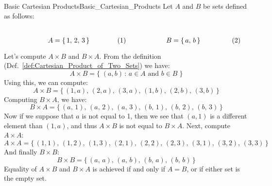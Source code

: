         \begin{fexample}{Basic Cartesian Products}{Basic_Cartesian_Products}
            Let $A$ and $B$ be sets defined as follows:
            \par
            \begin{subequations}
                \begin{minipage}[b]{0.49\textwidth}
                    \centering
                    \begin{equation}
                        A=\{\,1,\,2,\,3\,\}
                    \end{equation}
                \end{minipage}
                \hfill
                \begin{minipage}[b]{0.49\textwidth}
                    \centering
                    \begin{equation}
                        B=\{\,a,\,b\,\}
                    \end{equation}
                \end{minipage}
            \end{subequations}
            \par\vspace{2.5ex}
            Let's compute $A\times{B}$ and $B\times{A}$. From the definition
            (Def.~\ref{def:Cartesian_Product_of_Two_Sets}) we have:
            \begin{equation}
                A\times{B}=\{\;(a,b)\,:\,a\in{A}\textrm{ and }b\in{B}\;\}
            \end{equation}
            Using this, we can compute:
            \begin{equation}
                A\times{B}=\big\{\,(1,a),\,(2,a),\,(3,a),\,
                                   (1,b),\,(2,b),\,(3,b)\,\big\}
            \end{equation}
            Computing $B\times{A}$, we have:
            \begin{equation}
                B\times{A}=\big\{\,(a,\,1),\,(a,\,2),\,(a,\,3),\,
                                   (b,\,1),\,(b,\,2),\,(b,\,3)\,\big\}
            \end{equation}
            Now if we suppose that $a$ is not equal to 1, then we see that
            $(a,1)$ is a different element than $(1,a)$, and thus $A\times{B}$
            is not equal to $B\times{A}$. Next, compute $A\times{A}$:
            \begin{equation}
                A\times{A}=\big\{\,(1,1),\,(1,2),\,(1,3),\,
                                   (2,1),\,(2,2),\,(2,3),\,
                                   (3,1),\,(3,2),\,(3,3)\,\big\}
            \end{equation}
            And finally $B\times{B}$:
            \begin{equation}
                B\times{B}=\big\{\,(a,\,a),\,(a,\,b),
                                 \,(b,\,a),\,(b,\,b)\,\big\}
            \end{equation}
            Equality of $A\times{B}$ and $B\times{A}$ is achieved if and only
            if $A=B$, or if either set is the empty set.
        \end{fexample}
